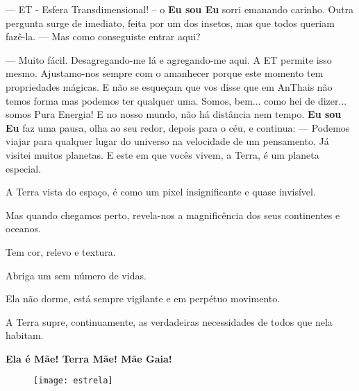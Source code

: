 — ET - Esfera Transdimensional! – o \textbf{Eu sou Eu} sorri emanando carinho.
\bigbreak
Outra pergunta surge de imediato, feita por um dos insetos, mas que todos queriam fazê-la.
\bigbreak
— Mas como conseguiste entrar aqui?

— Muito fácil. Desagregando-me lá e agregando-me aqui. A ET permite isso mesmo. Ajustamo-nos sempre com o amanhecer porque este momento tem propriedades mágicas. E não se esqueçam que vos disse que em AnThais não temos forma mas podemos ter qualquer uma. Somos, bem... como hei de dizer... somos Pura Energia! E no nosso mundo, não há distância nem tempo.
\bigbreak
\textbf{Eu sou Eu} faz uma pausa, olha ao seu redor, depois para o céu, e continua:
\bigbreak
— Podemos viajar para qualquer lugar do universo na velocidade de um pensamento. Já visitei muitos planetas. E este em que vocês vivem, a Terra, é um planeta especial.

A Terra vista do espaço, é como um pixel insignificante e quase invisível.

Mas quando chegamos perto, revela-nos a magnificência dos seus continentes e oceanos.

Tem cor, relevo e textura.

Abriga um sem número de vidas.

Ela não dorme, está sempre vigilante e em perpétuo movimento.

A Terra supre, continuamente, as verdadeiras necessidades de todos que nela habitam.

\bigbreak
\textbf{Ela é Mãe! Terra Mãe! Mãe Gaia!}

\begin{figure}[h]
    \centering
    \texttt{[image: estrela]}
\end{figure}